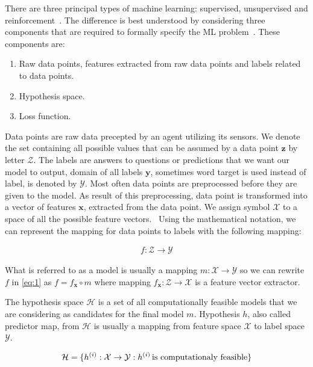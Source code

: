 \documentclass[english, 12pt, a4paper, elec, utf8, online]{aaltothesis}
\begin{document}
There are three principal types of machine learning: supervised, unsupervised and reinforcement~\cite{AIMA}. The difference is best understood by considering three components that are required to formally specify the ML problem~\cite{Jung2018}. These components are:
\begin{enumerate}
\item
Raw data points, features extracted from raw data points and labels related to data points.
\item 
Hypothesis space.
\item
Loss function.
\end{enumerate}

Data points are raw data precepted by an agent utilizing its sensors. We denote the set containing all possible values that can be assumed by a data point $\mathbf{z}$ by letter $\mathcal{Z}$. The labels are answers to questions or predictions that we want our model to output, domain of all labels $\mathbf{y}$, sometimes word target is used instead of label, is denoted by $\mathcal{Y}$. Most often data points are preprocessed before they are given to the model. As result of this preprocessing, data point is transformed into a vector of features $\mathbf{x}$, extracted from the data point. We assign symbol $\mathcal{X}$ to a space of all the possible feature vectors.~\cite{Jung2018} Using the mathematical notation, we can represent the mapping for data points to labels with the following mapping:

\begin{align}\label{eq:1}
f: \mathcal{Z} \rightarrow \mathcal{Y}
\end{align}

What is referred to as a model is usually a mapping $m:\mathcal{X} \rightarrow \mathcal{Y}$ so we can rewrite  $f$ in \ref{eq:1} as $f = f_{\mathbf{x}} \circ m$ where mapping $f_{\mathbf{x}}:\mathcal{Z} \rightarrow \mathcal{X}$ is a feature vector extractor.
\pagebreak

The hypothesis space $\mathcal{H}$  is a set of all computationally feasible models that we are considering as candidates for the final model $m$. Hypothesis $h$, also called predictor map, from $\mathcal{H}$ is usually a mapping from feature space $\mathcal{X}$ to label space $\mathcal{Y}$.~\cite{Jung2018}

\begin{align}\label{eq:2}
\mathcal{H} = \{h^{(i)}:\mathcal{X} \rightarrow \mathcal{Y} : h^{(i)} \mkern3mu \text{is computationaly feasible} \}
\end{align}
\end{document}
